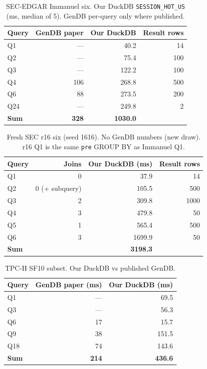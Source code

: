 \begin{table}[t]
  \centering
  \small
  \caption{SEC-EDGAR Immanuel six. Our DuckDB \texttt{SESSION\_HOT\_US}
    (ms, median of 5). GenDB per-query only where published.}
  \label{tab:sec-immanuel}
  \begin{tabular}{lrrr}
    \toprule
    Query & GenDB paper & Our DuckDB & Result rows \\
    \midrule
    Q1  & --- & 40.2 & 14 \\
    Q2  & --- & 75.4 & 100 \\
    Q3  & --- & 122.2 & 100 \\
    Q4  & 106 & 268.8 & 500 \\
    Q6  & 88  & 273.5 & 200 \\
    Q24 & --- & 249.8 & 2 \\
    \textbf{Sum} & \textbf{328} & \textbf{1030.0} & \\
    \bottomrule
  \end{tabular}
\end{table}

\begin{table}[t]
  \centering
  \small
  \caption{Fresh SEC r16 six (seed 1616). No GenDB numbers (new draw).
    r16 Q1 is the same \texttt{pre} GROUP BY as Immanuel Q1.}
  \label{tab:sec-r16}
  \begin{tabular}{lrrr}
    \toprule
    Query & Joins & Our DuckDB (ms) & Result rows \\
    \midrule
    Q1 & 0 & 37.9 & 14 \\
    Q2 & 0 (+ subquery) & 105.5 & 500 \\
    Q3 & 2 & 309.8 & 1000 \\
    Q4 & 3 & 479.8 & 50 \\
    Q5 & 1 & 565.4 & 500 \\
    Q6 & 3 & 1699.9 & 50 \\
    \textbf{Sum} & & \textbf{3198.3} & \\
    \bottomrule
  \end{tabular}
\end{table}

\begin{table}[t]
  \centering
  \small
  \caption{TPC-H SF10 subset. Our DuckDB vs published GenDB.}
  \label{tab:tpch-sf10}
  \begin{tabular}{lrr}
    \toprule
    Query & GenDB paper (ms) & Our DuckDB (ms) \\
    \midrule
    Q1  & --- & 69.5 \\
    Q3  & --- & 56.3 \\
    Q6  & 17 & 15.7 \\
    Q9  & 38 & 151.5 \\
    Q18 & 74 & 143.6 \\
    \textbf{Sum} & \textbf{214} & \textbf{436.6} \\
    \bottomrule
  \end{tabular}
\end{table}

